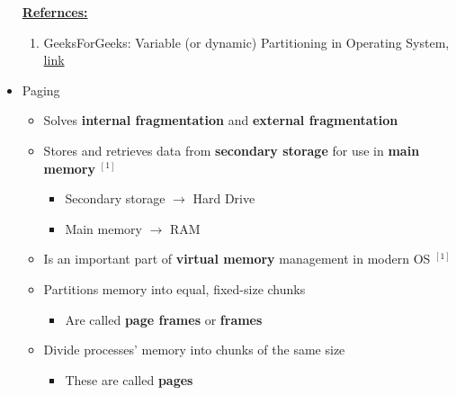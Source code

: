 \documentclass[12pt]{article}
\begin{document}
\begin{itemize}
    \underline{\textbf{Refernces:}}

    \bigskip

    \begin{enumerate}[1)]
        \item GeeksForGeeks: Variable (or dynamic) Partitioning in Operating System, \href{https://www.geeksforgeeks.org/variable-or-dynamic-partitioning-in-operating-system/}{link}
    \end{enumerate}
    \item Paging
    \begin{itemize}
        \item Solves \textbf{internal fragmentation} and \textbf{external fragmentation}
        \item Stores and retrieves data from \textbf{secondary storage} for use
        in \textbf{main memory} $^{[1]}$
        \begin{itemize}
            \item Secondary storage $\to$ Hard Drive
            \item Main memory $\to$ RAM
        \end{itemize}
        \item Is an important part of \textbf{virtual memory} management in modern
        OS $^{[1]}$
        \item Partitions memory into equal, fixed-size chunks
        \begin{itemize}
            \item Are called \textbf{page frames} or \textbf{frames}
        \end{itemize}
        \item Divide processes' memory into chunks of the same size
        \begin{itemize}
            \item These are called \textbf{pages}
        \end{itemize}
    \end{itemize}


\end{itemize}
\end{document}
